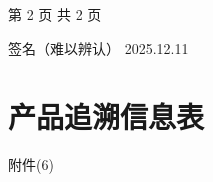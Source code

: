 \documentclass[UTF8,10pt,a4paper,fontset=fandol]{ctexart}
\newcommand{\fieldvalue}[1]{#1}
\newcommand{\handwritten}[1]{#1}
\begin{document}
\vfill

\begin{center}
第 2 页 共 2 页
\end{center}

\hfill
\fieldvalue{\handwritten{签名（难以辨认）}}
\quad
\fieldvalue{\handwritten{2025.12.11}}

\newpage

\section*{产品追溯信息表}

\handwritten{附件(6)}
\end{document}
